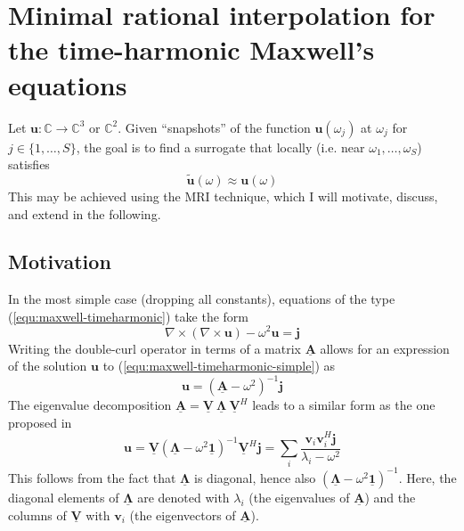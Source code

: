 \documentclass[11pt, a4paper]{article}
\begin{document}
\newpage
\section{Minimal rational interpolation for the time-harmonic Maxwell's equations}
\label{sec:mri}

Let $\mathbf{u} : \mathbb{C} \to \mathbb{C}^3$ or $\mathbb{C}^2$. Given \enquote{snapshots} of the
function $\mathbf{u}(\omega_j)$ at $\omega_j$ for $j \in \{1, \dots, S\}$, the
goal is to find a surrogate that locally (i.e. near $\omega_1, \dots, \omega_S$)
satisfies
\begin{equation}
    \mathbf{\tilde{u}}(\omega) \approx \mathbf{u}(\omega)
\end{equation}
This may be achieved using the \acrfull{MRI} technique, which I will motivate,
discuss, and extend in the following.

\subsection{Motivation}
\label{subsec:motivation}

In the most simple case (dropping all constants), equations of the type
(\ref{equ:maxwell-timeharmonic}) take the form
\begin{equation}
    \nabla \times (\nabla \times \mathbf{u}) - \omega^2 \mathbf{u} = \mathbf{j}
    \label{equ:maxwell-timeharmonic-simple}
\end{equation}
Writing the double-curl operator in terms of a matrix $\mathbf{\underline{A}}$
allows for an expression of the solution $\mathbf{u}$ to (\ref{equ:maxwell-timeharmonic-simple})
as
\begin{equation}
    \mathbf{u} = (\mathbf{\underline{A}} - \omega^2)^{-1} \mathbf{j}
\end{equation}
The eigenvalue decomposition $\mathbf{\underline{A}} = \mathbf{\underline{V}}
~ \boldsymbol{\underline{\Lambda}} ~ \mathbf{\underline{V}}^H$
leads to a similar form as the one proposed in \cite{helmholtz-motivation}
\begin{equation}
    \mathbf{u} = \mathbf{\underline{V}} (\boldsymbol{\underline{\Lambda}} - \omega^2 \boldsymbol{\underline{1}})^{-1} \mathbf{\underline{V}}^H \mathbf{j} 
    = \sum_i \frac{\mathbf{v}_i \mathbf{v}_i^H \mathbf{j}}{\lambda_i - \omega^2} \label{equ:motivation}
\end{equation}
This follows from the fact that $\boldsymbol{\underline{\Lambda}}$ is diagonal,
hence also $(\boldsymbol{\underline{\Lambda}} - \omega^2 \boldsymbol{\underline{1}})^{-1}$.
Here, the diagonal elements of $\boldsymbol{\underline{\Lambda}}$ are denoted with 
$\lambda_i$ (the eigenvalues of $\mathbf{\underline{A}}$) and the columns of
$\mathbf{\underline{V}}$ with $\mathbf{v}_i$ (the eigenvectors of $\mathbf{\underline{A}}$).
\end{document}
